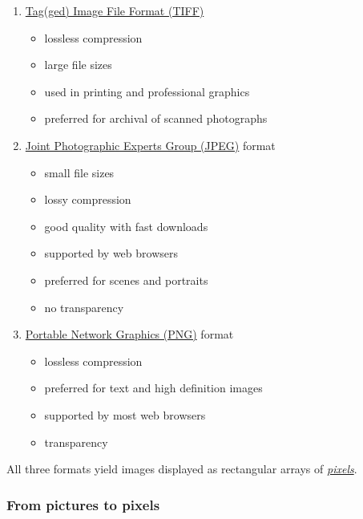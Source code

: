 \documentclass[
  11pt,
  british,
  a4paper,
]{article}
\providecommand{\tightlist}{%
  \setlength{\itemsep}{0pt}\setlength{\parskip}{0pt}}
\begin{document}
\begin{enumerate}
\tightlist
\item
  \href{https://en.wikipedia.org/wiki/TIFF}{Tag(ged) Image File Format
  (TIFF)}

  \begin{itemize}
  \tightlist
  \item
    lossless compression
  \item
    large file sizes
  \item
    used in printing and professional graphics
  \item
    preferred for archival of scanned photographs
  \end{itemize}
\item
  \href{https://jpeg.org/about.html}{Joint Photographic Experts Group
  (JPEG)} format

  \begin{itemize}
  \tightlist
  \item
    small file sizes
  \item
    lossy compression
  \item
    good quality with fast downloads
  \item
    supported by web browsers
  \item
    preferred for scenes and portraits
  \item
    no transparency
  \end{itemize}
\item
  \href{http://www.libpng.org/pub/png/}{Portable Network Graphics (PNG)}
  format

  \begin{itemize}
  \tightlist
  \item
    lossless compression
  \item
    preferred for text and high definition images
  \item
    supported by most web browsers
  \item
    transparency
  \end{itemize}
\end{enumerate}

All three formats yield images displayed as rectangular arrays of
\href{https://en.wikipedia.org/wiki/Pixels}{\emph{pixels}}.

\hypertarget{from-pictures-to-pixels}{%
\subsubsection{From pictures to pixels}\label{from-pictures-to-pixels}}
\end{document}
